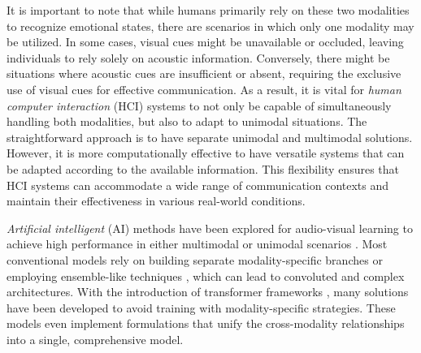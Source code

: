 \documentclass{article}
\begin{document}
It is important to note that while humans primarily rely on these two modalities to recognize emotional states, there are scenarios in which only one modality may be utilized. In some cases, visual cues might be unavailable or occluded, leaving individuals to rely solely on acoustic information. Conversely, there might be situations where acoustic cues are insufficient or absent, requiring the exclusive use of visual cues for effective communication. As a result, it is vital for \emph{human computer interaction} (HCI) systems to not only be capable of simultaneously handling both modalities, but also to adapt to unimodal situations. The straightforward approach is to have separate unimodal and multimodal solutions. However, it is more computationally effective to have versatile systems that can be adapted according to the available information. This flexibility ensures that HCI systems can accommodate a wide range of communication contexts and maintain their effectiveness in various real-world conditions.

\emph{Artificial intelligent} (AI) methods have been explored for audio-visual learning to achieve high performance in either multimodal or unimodal scenarios \cite{Zhu_2021_2,Parthasarathy_2020_2, Goncalves_2022_3}. Most conventional models rely on building separate modality-specific branches \cite{Ngiam_2011, arandjelovic_2017, Antoniadis_2021} or employing ensemble-like techniques \cite{Hao_2020}, which can lead to convoluted and complex architectures. With the introduction of transformer frameworks \cite{Vaswani_2017}, many solutions have been developed to avoid training with modality-specific strategies. These models even implement formulations that unify the cross-modality relationships \cite{Akbari_2021,gong_2022} into a single, comprehensive model.
\end{document}
